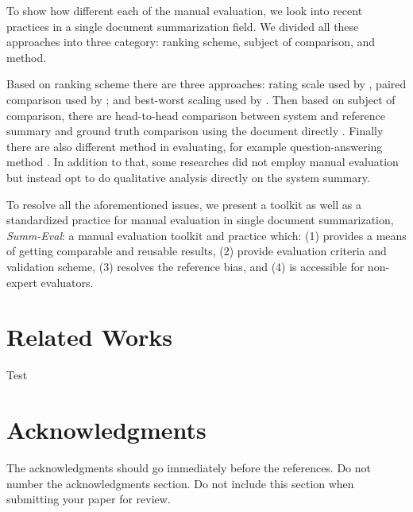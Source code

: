 \documentclass[11pt,a4paper]{article}
\begin{document}
To show how different each of the manual evaluation, we look into recent practices in a single document summarization field. We divided all these approaches into three category: ranking scheme, subject of comparison, and method. 

Based on ranking scheme there are three approaches: rating scale \citep{Likert1932} used by \citet{Kryscinski2018}, paired comparison \citep{Thurstone1994} used by \citet{Fan2018, Celikyilmaz2018}; and best-worst scaling \citep{Woodworth1991} used by \citet{Shashi2018}. Then based on subject of comparison, there are head-to-head comparison between system and reference summary \citep{Celikyilmaz2018} and ground truth comparison using the document directly \citep{Shashi2018, Kryscinski2018}. Finally there are also different method in evaluating, for example question-answering method \citep{Clarke2010, Shashi2018}. In addition to that, some researches \citep{Nallapati2016a, See2017, Gehrmann2018} did not employ manual evaluation but instead opt to do qualitative analysis directly on the system summary.

To resolve all the aforementioned issues, we present a toolkit as well as a standardized practice for manual evaluation in single document summarization, \textit{Summ-Eval}: a manual evaluation toolkit and practice which: (1) provides a means of getting comparable and reusable results, (2) provide evaluation criteria and validation scheme, (3) resolves the reference bias, and (4) is accessible for non-expert evaluators.

\section{Related Works}
Test

\section*{Acknowledgments}

The acknowledgments should go immediately before the references.  Do
not number the acknowledgments section. Do not include this section
when submitting your paper for review.




\appendix
\end{document}
